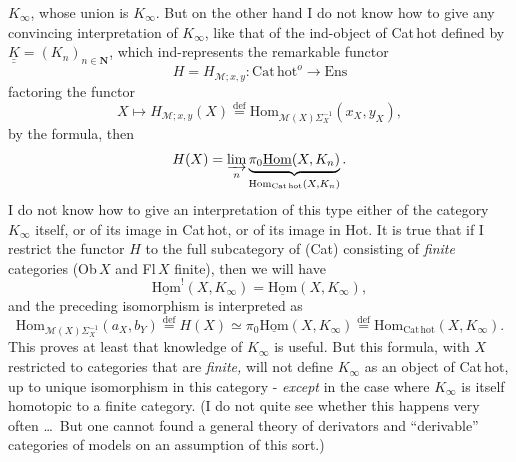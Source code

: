 \documentclass[11pt]{article}
\newcommand{\printedpage}[1]{\marginpar{\footnotesize p.~#1}}
\newcommand{\msp}[1]{\marginpar{\footnotesize [#1]}}
\newcommand{\Cathot}{\mathrm{Cat\,hot}}
\newcommand{\uHom}{\underline{\mathrm{Hom}}}
\newcommand{\uuK}{\underline{\underline{K}}}
\newcommand{\Hom}{\mathrm{Hom}}
\newcommand{\Ens}{\mathrm{Ens}}
\newcommand{\defeq}{\overset{\text{def}}{=}}
\begin{document}
\printedpage{29}
$K_\infty$, whose union is $K_\infty$. But on the other hand I do not know how to give any convincing interpretation of $K_\infty$, like that of the ind-object of Cat\,hot defined by $\uuK = (K_n)_{n\in\mathbf{N}}$, which ind-represents the remarkable functor %
\[
H = H_{\mathcal{M};x,y} : \Cathot^{o} \longrightarrow \Ens
\]
factoring the functor
\msp{page 45}
\[
X \longmapsto H_{\mathcal{M};x,y}(X) \defeq \Hom_{\mathcal{M}(X)\Sigma_X^{-1}}(x_X, y_X),
\]
by the formula, then
\[
H(X) = \varinjlim_{n} \underbrace{\pi_0\uHom(X, K_n)}_{\Hom_{\Cathot}(X,K_n)} .
\]
I do not know how to give an interpretation of this type either of the category $K_\infty$ itself, or of its image in Cat\,hot, or of its image in Hot. It is true that if I restrict the functor $H$ to the full subcategory of (Cat) consisting of \textit{finite} categories (Ob\,$X$ and Fl\,$X$ finite), then we will have
\[
\uHom^{!}(X, K_\infty) = \uHom(X, K_\infty),
\]
and the preceding isomorphism is interpreted as %
\[
\Hom_{\mathcal{M}(X)\Sigma_X^{-1}}(a_X, b_Y) \defeq H(X) \simeq \pi_0\uHom(X, K_\infty) \defeq \Hom_{\Cathot}(X, K_\infty).
\]
 This proves at least that knowledge of $K_\infty$ is useful. But this formula, with $X$ restricted to categories that are \textit{finite,} will not define $K_\infty$ as an object of Cat\,hot, up to unique isomorphism in this category - \textit{except} in the case where $K_\infty$ is itself homotopic to a
\msp{page 46}
finite category. (I do not quite see whether this happens very often \ldots\ But one cannot found a general theory of derivators and ``derivable'' categories of models on an assumption of this sort.)
\end{document}
